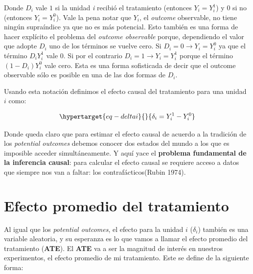 \documentclass[
  letterpaper,
  DIV=11,
  numbers=noendperiod,
  oneside]{scrreprt}
\begin{document}
Donde \(D_i\) vale \(1\) si la unidad \emph{i} recibió el tratamiento
(entonces \(Y_i=Y_i^1\)) y \(0\) si no (entonces \(Y_i=Y_i^0\)). Vale la
pena notar que \(Y_i\), el \emph{outcome} observable, no tiene ningún
supraíndice ya que no es más potencial. Esto también es una forma de
hacer explícito el problema del \emph{outcome observable} porque,
dependiendo el valor que adopte \(D_i\) uno de los términos se vuelve
cero. Si \(D_i=0 \rightarrow Y_i=Y_i^0\) ya que el término \(D_i Y_i^1\)
vale 0. Si por el contrario \(D_i=1 \rightarrow Y_i=Y_i^1\) porque el
término \((1-D_i) Y_i^0\) vale cero. Esta es una forma sofisticada de
decir que el outcome observable sólo es posible en una de las dos formas
de \(D_i\).

Usando esta notación definimos el efecto causal del tratamiento para una
unidad \(i\) como:

\begin{equation}\protect\hypertarget{eq-deltai}{}{
\delta_i = Y_i^1 - Y_i^0 
}\label{eq-deltai}\end{equation}

Donde queda claro que para estimar el efecto causal de acuerdo a la
tradición de los \emph{potential outcomes} debemos conocer dos estados
del mundo a los que es imposible acceder simultáneamente. Y aquí yace el
\textbf{problema fundamental de la inferencia causal}: para calcular el
efecto causal se requiere acceso a datos que siempre nos van a faltar:
los contrafácticos(Rubin
1974).

\hypertarget{efecto-promedio-del-tratamiento}{%
\section{Efecto promedio del
tratamiento}\label{efecto-promedio-del-tratamiento}}

Al igual que los \emph{potential outcomes}, el efecto para la unidad
\(i\) (\(\delta_i\)) también es una variable aleatoria, y su esperanza
es lo que vamos a llamar el efecto promedio del tratamiento
(\textbf{ATE}). El
\textbf{ATE} va a ser la magnitud de interés en nuestros experimentos,
el efecto promedio de mi tratamiento. Este se define de la siguiente
forma:
\end{document}
